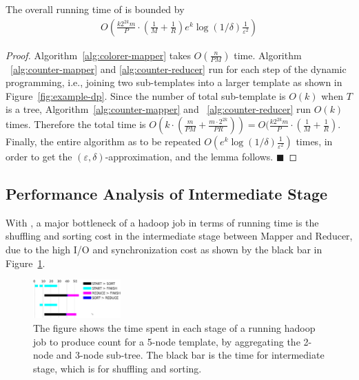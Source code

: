\begin{lemma}
\label{lemma:total}
The overall running time of \sahad{} is bounded by %
\begin{equation}
\label{eq:total-time}
\begin{array}{lcl}
O(\frac{k2^{2k}m}{P} \cdot (\frac{1}{M}+\frac{1}{R})e^k\log{(1/\delta)}\frac{1}{\varepsilon^2})
\end{array}
\end{equation}
\end{lemma}
\begin{proof}
Algorithm~\ref{alg:colorer-mapper} takes $O(\frac{n}{PM})$ time. Algorithm
~\ref{alg:counter-mapper} and \ref{alg:counter-reducer} run for each step of the
dynamic programming, i.e., joining two sub-templates into a larger template as
shown in Figure~\ref{fig:example-dp}. Since the number of total sub-template is
$O(k)$ when $T$ is a tree, Algorithm~\ref{alg:counter-mapper} and
~\ref{alg:counter-reducer} run $O(k)$ times. Therefore the total time is 
$O(k \cdot (\frac{m}{PM} + \frac{m \cdot 2^{2k}}{PR})) = 
O(\frac{k2^{2k}m}{P} \cdot (\frac{1}{M}+\frac{1}{R})$.
Finally, the entire algorithm as to be repeated
$O(e^k\log{(1/\delta)}\frac{1}{\varepsilon^2})$ times,
in order to get the $(\varepsilon,\delta)$-approximation, and the lemma follows.
\hfill\ensuremath{\blacksquare}
\end{proof}



\subsection{Performance Analysis of Intermediate Stage}

With \sahad{}, a major bottleneck of a hadoop job in terms of running time
is the shuffling and sorting cost in the intermediate stage between Mapper and
Reducer, due to the high I/O and synchronization cost as shown by the black bar
in Figure~\ref{fig:sahad-breakdown}.

\begin{figure}[htbp]
\centerline{\includegraphics[width=0.30\textwidth]{plots/sahad-breakdown.eps}}

\caption{The figure shows the time spent in each stage of a running hadoop job
to produce count for a 5-node template, by aggregating the 2-node and 3-node
sub-tree. The black bar is the time for intermediate stage, which is for
shuffling and sorting.} 

\label{fig:sahad-breakdown} 
\end{figure}


